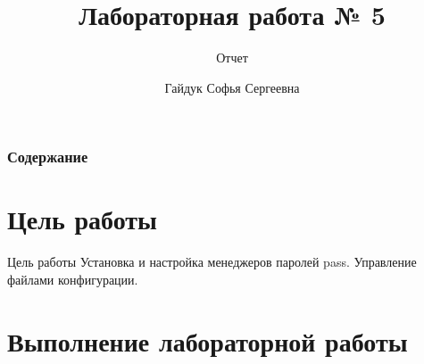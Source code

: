 \documentclass[
  ignorenonframetext,
  aspectratio=169,
  russian,
]{beamer}
\title{Лабораторная работа № 5}
\subtitle{Отчет}
\author{Гайдук Софья Сергеевна}
\date{}
\renewcommand*\contentsname{Содержание}
\newcommand\contentsname{Содержание}
\begin{document}
\frame{\titlepage}

\renewcommand*\contentsname{Содержание}
\begin{frame}[allowframebreaks]
  \frametitle{Содержание}
  \setcounter{tocdepth}{1}
  \tableofcontents
\end{frame}

\section{Цель
работы}\label{ux446ux435ux43bux44c-ux440ux430ux431ux43eux442ux44b}

\begin{frame}{Цель работы}
Установка и настройка менеджеров паролей pass. Управление файлами
конфигурации.
\end{frame}

\section{Выполнение лабораторной
работы}\label{ux432ux44bux43fux43eux43bux43dux435ux43dux438ux435-ux43bux430ux431ux43eux440ux430ux442ux43eux440ux43dux43eux439-ux440ux430ux431ux43eux442ux44b}
\end{document}
